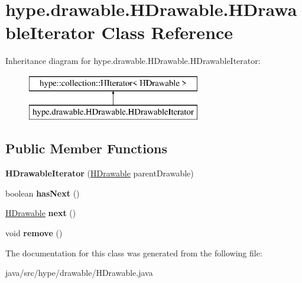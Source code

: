 \hypertarget{classhype_1_1drawable_1_1_h_drawable_1_1_h_drawable_iterator}{\section{hype.\-drawable.\-H\-Drawable.\-H\-Drawable\-Iterator Class Reference}
\label{classhype_1_1drawable_1_1_h_drawable_1_1_h_drawable_iterator}
}
Inheritance diagram for hype.\-drawable.\-H\-Drawable.\-H\-Drawable\-Iterator\-:\begin{figure}[H]
\begin{center}
\leavevmode
\includegraphics[height=2.000000cm]{classhype_1_1drawable_1_1_h_drawable_1_1_h_drawable_iterator}
\end{center}
\end{figure}
\subsection*{Public Member Functions}
\begin{DoxyCompactItemize}
\item 
\hypertarget{classhype_1_1drawable_1_1_h_drawable_1_1_h_drawable_iterator_aa356b83b88b0cd3849b78ff12d596d60}{{\bfseries H\-Drawable\-Iterator} (\hyperlink{classhype_1_1drawable_1_1_h_drawable}{H\-Drawable} parent\-Drawable)}\label{classhype_1_1drawable_1_1_h_drawable_1_1_h_drawable_iterator_aa356b83b88b0cd3849b78ff12d596d60}

\item 
\hypertarget{classhype_1_1drawable_1_1_h_drawable_1_1_h_drawable_iterator_a35ceddbe62525540cc4250e82360677d}{boolean {\bfseries has\-Next} ()}\label{classhype_1_1drawable_1_1_h_drawable_1_1_h_drawable_iterator_a35ceddbe62525540cc4250e82360677d}

\item 
\hypertarget{classhype_1_1drawable_1_1_h_drawable_1_1_h_drawable_iterator_acdbe2dcbb605ea2040148632321367ac}{\hyperlink{classhype_1_1drawable_1_1_h_drawable}{H\-Drawable} {\bfseries next} ()}\label{classhype_1_1drawable_1_1_h_drawable_1_1_h_drawable_iterator_acdbe2dcbb605ea2040148632321367ac}

\item 
\hypertarget{classhype_1_1drawable_1_1_h_drawable_1_1_h_drawable_iterator_a23aef8aa592c78f8fd7883dd3b565f20}{void {\bfseries remove} ()}\label{classhype_1_1drawable_1_1_h_drawable_1_1_h_drawable_iterator_a23aef8aa592c78f8fd7883dd3b565f20}

\end{DoxyCompactItemize}


The documentation for this class was generated from the following file\-:\begin{DoxyCompactItemize}
\item 
java/src/hype/drawable/H\-Drawable.\-java\end{DoxyCompactItemize}
